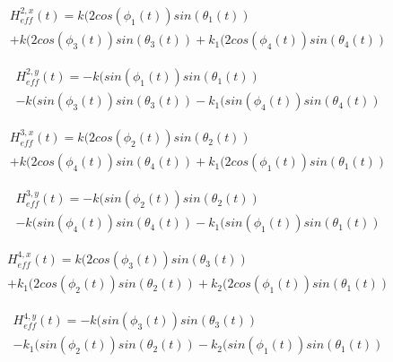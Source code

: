 \documentclass[10pt]{article}
\begin{document}
\begin{multline}
H_{eff}^{2,x}(t) =  k (2 cos(\phi_1(t)) sin(\theta_1(t)) \\
            +  k (2 cos(\phi_3(t)) sin(\theta_3(t)) + k_1 (2 cos(\phi_4(t)) sin(\theta_4(t)) 
\label{RFfield_Row_2x}    
\end{multline}

\vspace{-1.5em}

\begin{multline}
H_{eff}^{2,y}(t) =  - k ( sin(\phi_1(t)) sin(\theta_1(t)) \\
            -  k (sin(\phi_3(t)) sin(\theta_3(t)) - k_1 (sin(\phi_4(t)) sin(\theta_4(t)) 
\label{RFfield_Row_2y}    
\end{multline}

\vspace{-1.5em}

\begin{multline}
H_{eff}^{3,x}(t) =  k (2 cos(\phi_2(t)) sin(\theta_2(t)) \\
            +  k (2 cos(\phi_4(t)) sin(\theta_4(t)) + k_1 (2 cos(\phi_1(t)) sin(\theta_1(t)) 
\label{RFfield_Row_3x}    
\end{multline}

\vspace{-1.5em}

\begin{multline}
H_{eff}^{3,y}(t) =  - k ( sin(\phi_2(t)) sin(\theta_2(t)) \\
            -  k (sin(\phi_4(t)) sin(\theta_4(t)) - k_1 (sin(\phi_1(t)) sin(\theta_1(t)) 
\label{RFfield_Row_3y}    
\end{multline}

\vspace{-1.5em}

\begin{multline}
H_{eff}^{4,x}(t) =  k (2 cos(\phi_3(t)) sin(\theta_3(t)) \\
            +  k_1 (2 cos(\phi_2(t)) sin(\theta_2(t)) + k_2 (2 cos(\phi_1(t)) sin(\theta_1(t)) 
\label{RFfield_Row_4x}    
\end{multline}

\vspace{-1.5em}

\begin{multline}
H_{eff}^{4,y}(t) =  - k ( sin(\phi_3(t)) sin(\theta_3(t)) \\
            -  k_1 (sin(\phi_2(t)) sin(\theta_2(t)) - k_2 (sin(\phi_1(t)) sin(\theta_1(t)) 
\label{RFfield_Row_4y}    
\end{multline}
\end{document}
